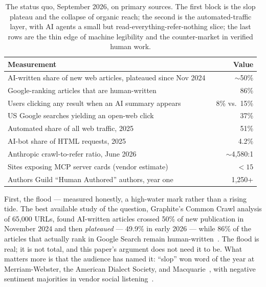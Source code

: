 \documentclass[10pt,letterpaper,twocolumn]{article}
\begin{document}
\begin{table}[t]
\centering
\small
\begin{tabularx}{\columnwidth}{>{\raggedright\arraybackslash}X r}
\toprule
\textbf{Measurement} & \textbf{Value} \\
\midrule
AI-written share of new web articles, plateaued since Nov 2024~\citep{graphite2026plateau} & $\sim$50\% \\
Google-ranking articles that are human-written~\citep{graphite2026plateau} & 86\% \\
Users clicking any result when an AI summary appears~\citep{pew2025aioverviews} & 8\% vs.\ 15\% \\
US Google searches yielding an open-web click~\citep{sparktoro2024zeroclick} & 37\% \\
Automated share of all web traffic, 2025~\citep{thales2025badbot} & 51\% \\
AI-bot share of HTML requests, 2025~\citep{cloudflare2025yir} & 4.2\% \\
Anthropic crawl-to-refer ratio, June 2026~\citep{cloudflare2026crawlrefer} & $\sim$4{,}580:1 \\
Sites exposing MCP server cards (vendor estimate)~\citep{discoveredlabs2026webmcp} & $<15$ \\
Authors Guild ``Human Authored'' authors, year one~\citep{authorsguild2026humanauthored} & 1{,}250+ \\
\bottomrule
\end{tabularx}
\caption{The status quo, September 2026, on primary sources. The first block is the slop plateau and the collapse of organic reach; the second is the automated-traffic layer, with AI agents a small but read-everything-refer-nothing slice; the last rows are the thin edge of machine legibility and the counter-market in verified human work.}
\label{tab:statusquo}
\end{table}

First, the flood --- measured honestly, a high-water mark rather than a rising tide. The best available study of the question, Graphite's Common Crawl analysis of 65{,}000 URLs, found AI-written articles crossed 50\% of new publication in November 2024 and then \emph{plateaued} --- 49.9\% in early 2026 --- while 86\% of the articles that actually rank in Google Search remain human-written~\citep{graphite2026plateau,axios2025plateau}. The flood is real; it is not total, and this paper's argument does not need it to be. What matters more is that the audience has named it: ``slop'' won word of the year at Merriam-Webster, the American Dialect Society, and Macquarie~\citep{techcrunch2025woty,ads2026slop}, with negative sentiment majorities in vendor social listening~\citep{meltwater2026slop,fortune2026slopwar}.
\end{document}
